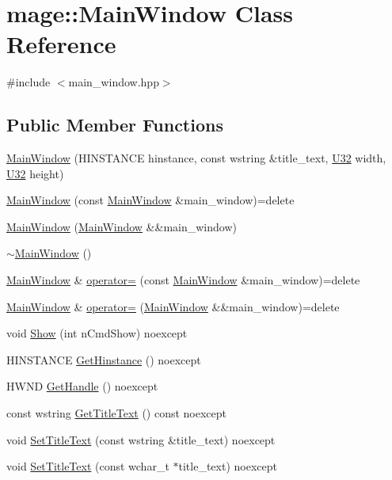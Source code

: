 \hypertarget{classmage_1_1_main_window}{}\section{mage\+:\+:Main\+Window Class Reference}
\label{classmage_1_1_main_window}


{\ttfamily \#include $<$main\+\_\+window.\+hpp$>$}

\subsection*{Public Member Functions}
\begin{DoxyCompactItemize}
\item 
\hyperlink{classmage_1_1_main_window_a007e36554196bc6aa38e9191cdedf587}{Main\+Window} (H\+I\+N\+S\+T\+A\+N\+CE hinstance, const wstring \&title\+\_\+text, \hyperlink{namespacemage_a41c104c036fba3756a74e19f793eeaa1}{U32} width, \hyperlink{namespacemage_a41c104c036fba3756a74e19f793eeaa1}{U32} height)
\item 
\hyperlink{classmage_1_1_main_window_a8dc3c590bb168f8178a7db72ff60fd0c}{Main\+Window} (const \hyperlink{classmage_1_1_main_window}{Main\+Window} \&main\+\_\+window)=delete
\item 
\hyperlink{classmage_1_1_main_window_ab5c9cc962420580c62dd2b44c142cf4b}{Main\+Window} (\hyperlink{classmage_1_1_main_window}{Main\+Window} \&\&main\+\_\+window)
\item 
\hyperlink{classmage_1_1_main_window_ada7ecf97d82ce08ba2f31f0afd891031}{$\sim$\+Main\+Window} ()
\item 
\hyperlink{classmage_1_1_main_window}{Main\+Window} \& \hyperlink{classmage_1_1_main_window_a0c2414ae4e627fb401c045371c286de0}{operator=} (const \hyperlink{classmage_1_1_main_window}{Main\+Window} \&main\+\_\+window)=delete
\item 
\hyperlink{classmage_1_1_main_window}{Main\+Window} \& \hyperlink{classmage_1_1_main_window_a684d547966f69ef5df793b5ce516f76a}{operator=} (\hyperlink{classmage_1_1_main_window}{Main\+Window} \&\&main\+\_\+window)=delete
\item 
void \hyperlink{classmage_1_1_main_window_abbb86e7f4dab1b43ca28f83e265f511e}{Show} (int n\+Cmd\+Show) noexcept
\item 
H\+I\+N\+S\+T\+A\+N\+CE \hyperlink{classmage_1_1_main_window_a1b8c851147ea3b51e645c2fce961fe17}{Get\+Hinstance} () noexcept
\item 
H\+W\+ND \hyperlink{classmage_1_1_main_window_ab4520f7c5ef0828535a117a8512221b5}{Get\+Handle} () noexcept
\item 
const wstring \hyperlink{classmage_1_1_main_window_a16ea3780659e00c8e4732b518c7c4a1e}{Get\+Title\+Text} () const noexcept
\item 
void \hyperlink{classmage_1_1_main_window_aaadd51dc2b902d93ea2f28d685477301}{Set\+Title\+Text} (const wstring \&title\+\_\+text) noexcept
\item 
void \hyperlink{classmage_1_1_main_window_a1baa8554782be197fb5932c3af461f0e}{Set\+Title\+Text} (const wchar\+\_\+t $\ast$title\+\_\+text) noexcept
\end{DoxyCompactItemize}
